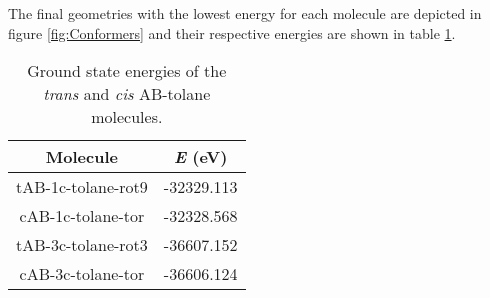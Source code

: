 %
The final geometries with the lowest energy for each molecule are depicted in figure \ref{fig:Conformers} and their respective energies are shown in table \ref{tab:GS-energy-conformers}.
%
%
\begin{table}[ht]
\caption{Ground state energies of the \textit{trans} and \textit{cis} AB-tolane molecules.}
\label{tab:GS-energy-conformers}
\centering
\vspace{0.1 cm}
\begin{tabular}{cc} 
\toprule
Molecule           & \textit{E} (\si{\eV}) \\
\midrule
tAB-1c-tolane-rot9 & -32329.113  \\
cAB-1c-tolane-tor  & -32328.568 \\
\midrule
tAB-3c-tolane-rot3 & -36607.152 \\
cAB-3c-tolane-tor  & -36606.124 \\
\bottomrule
\end{tabular}
\end{table}
%
%
\begin{comment}
To determine the conformer with the lowest ground state energy, we had to to sample through a large number of different conformers. To automate this procedure the program CREST was used. The resulting ten lowest rotamers of the corresponding conformers were then optimized with DFT CAM-B3LYP D3\_BJ and the resulting GS energy is listed in Table (TABLE REF).

Since we were interested in conformers with the lowest ground state energy, we initially modeled those manually and then optimised the raw structures using DFT. Due to the vast possibilities in geometries this task was automated using 
\end{comment}
